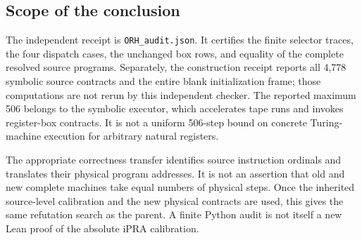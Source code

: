 \subsection{Scope of the conclusion}
The independent receipt is \texttt{ORH\_audit.json}. It certifies the
finite selector traces, the four dispatch cases, the unchanged box rows,
and equality of the complete resolved source programs. Separately, the
construction receipt reports all 4,778 symbolic source contracts and the
entire blank initialization frame; those computations are not rerun by
this independent checker. The reported maximum 506 belongs to the
symbolic executor, which accelerates tape runs and invokes register-box
contracts. It is not a uniform 506-step bound on concrete Turing-machine
execution for arbitrary natural registers.

The appropriate correctness transfer identifies source instruction
ordinals and translates their physical program addresses. It is not an
assertion that old and new complete machines take equal numbers of
physical steps. Once the inherited source-level calibration and the
new physical contracts are used, this gives the same refutation search
as the parent. A finite Python audit is not itself a new Lean proof of
the absolute iPRA calibration.
